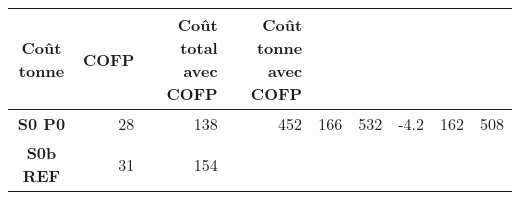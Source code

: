 \begin{longtable}[]{@{}crrrrrrrr@{}}
\begin{minipage}[b]{0.08\columnwidth}
Coût tonne\strut
\end{minipage} & \begin{minipage}[b]{0.04\columnwidth}\raggedleft\strut
COFP\strut
\end{minipage} & \begin{minipage}[b]{0.14\columnwidth}\raggedleft\strut
Coût total avec COFP\strut
\end{minipage} & \begin{minipage}[b]{0.14\columnwidth}\raggedleft\strut
Coût tonne avec COFP\strut
\end{minipage}\tabularnewline
\midrule
\endhead
\begin{minipage}[t]{0.09\columnwidth}\centering\strut
\textbf{S0 P0}\strut
\end{minipage} & \begin{minipage}[t]{0.09\columnwidth}\raggedleft\strut
28\strut
\end{minipage} & \begin{minipage}[t]{0.07\columnwidth}\raggedleft\strut
138\strut
\end{minipage} & \begin{minipage}[t]{0.06\columnwidth}\raggedleft\strut
452\strut
\end{minipage} & \begin{minipage}[t]{0.08\columnwidth}\raggedleft\strut
166\strut
\end{minipage} & \begin{minipage}[t]{0.08\columnwidth}\raggedleft\strut
532\strut
\end{minipage} & \begin{minipage}[t]{0.04\columnwidth}\raggedleft\strut
-4.2\strut
\end{minipage} & \begin{minipage}[t]{0.14\columnwidth}\raggedleft\strut
162\strut
\end{minipage} & \begin{minipage}[t]{0.14\columnwidth}\raggedleft\strut
508\strut
\end{minipage}\tabularnewline
\begin{minipage}[t]{0.09\columnwidth}\centering\strut
\textbf{S0b REF}\strut
\end{minipage} & \begin{minipage}[t]{0.09\columnwidth}\raggedleft\strut
31\strut
\end{minipage} & \begin{minipage}[t]{0.07\columnwidth}\raggedleft\strut
154\strut
\end{minipage} & \begin{minipage}[t]{0.06\columnwidth}\raggedleft\strut

\end{minipage}
\end{longtable}
